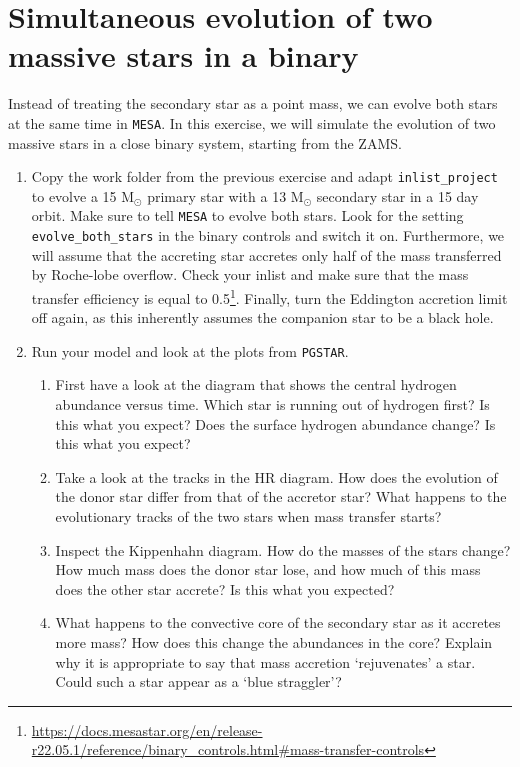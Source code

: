 \documentclass[11pt,a4paper]{article}
\begin{document}
\section{Simultaneous evolution of two massive stars in a binary}

Instead of treating the secondary star as a point mass, we can evolve both stars at the same time in \texttt{MESA}. In this exercise, we will simulate the evolution of two massive stars in a close binary system, starting from the ZAMS.

\begin{enumerate}
\item Copy the work folder from the previous exercise and adapt \verb|inlist_project| to evolve a 15 M$_\odot$ primary star with a 13 M$_\odot$ secondary star in a 15 day orbit. Make sure to tell \texttt{MESA} to evolve both stars. Look for the setting \verb|evolve_both_stars| in the binary controls and switch it on. Furthermore, we will assume that the accreting star accretes only half of the mass transferred by Roche-lobe overflow. Check your inlist and make sure that the mass transfer efficiency is equal to 0.5\footnote{\url{https://docs.mesastar.org/en/release-r22.05.1/reference/binary_controls.html\#mass-transfer-controls}}. Finally, turn the Eddington accretion limit off again, as this inherently assumes the companion star to be a black hole.
\item Run your model and look at the plots from \texttt{PGSTAR}.
\begin{enumerate}
\item First have a look at the diagram that shows the central hydrogen abundance versus time. Which star is running out of hydrogen first? Is this what you expect? Does the surface hydrogen abundance change? Is this what you expect?
\item Take a look at the tracks in the HR diagram. How does the evolution of the donor star differ from that of the accretor star? What happens to the evolutionary tracks of the two stars when mass transfer starts?
\item Inspect the Kippenhahn diagram. How do the masses of the stars change? How much mass does the donor star lose, and how much of this mass does the other star accrete? Is this what you expected? 
\item What happens to the convective core of the secondary star as it accretes more mass? How does this change the abundances in the core? Explain why it is appropriate to say that mass accretion `rejuvenates' a star. Could such a star appear as a `blue straggler'?
\end{enumerate}
\end{enumerate}


% 
% 
\end{document}
